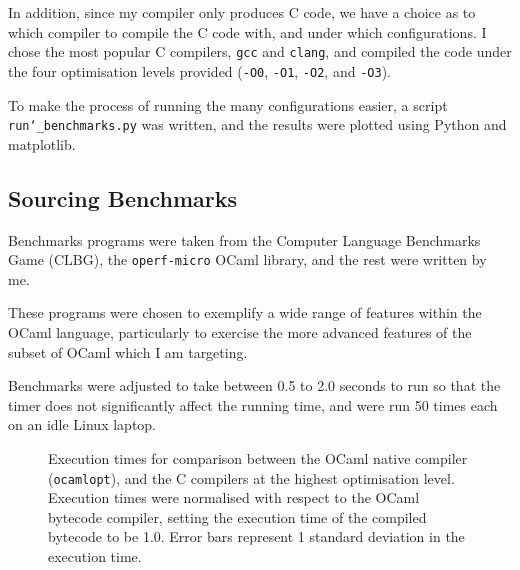 \documentclass[12pt,a4paper,twoside,openright]{report}
\begin{document}
In addition, since my compiler only produces C code, we have a choice as to 
which compiler to compile the C code with, and under which configurations. I 
chose the most popular C compilers, \texttt{gcc} and \texttt{clang}, and 
compiled the code under the four optimisation levels provided (\texttt{-O0}, 
\texttt{-O1}, \texttt{-O2}, and \texttt{-O3}).

To make the process of running the many configurations easier, a script 
\texttt{run\char`_benchmarks.py} was written, and the results were plotted 
using Python and matplotlib.

\subsection{Sourcing Benchmarks}

Benchmarks programs were taken from the Computer Language Benchmarks Game 
(CLBG)\cite{benchmarks-game}, the \texttt{operf-micro}\cite{operf-micro} OCaml 
library, and the rest were written by me.

These programs were chosen to exemplify a wide range of features within the 
OCaml language, particularly to exercise the more advanced features of the 
subset of OCaml which I am targeting.

Benchmarks were adjusted to take between 0.5 to 2.0 seconds to run so that the 
timer does not significantly affect the running time, and were run 50 times 
each on an idle Linux laptop.

\begin{figure}
    \label{fig:raw-benchmarks}
    \centering
    \caption{Execution times for comparison between the OCaml native compiler 
    (\texttt{ocamlopt}), and the C compilers at the highest optimisation level. 
    Execution times were normalised with respect to the OCaml bytecode 
    compiler, setting the execution time of the compiled bytecode to be 1.0. 
    Error bars represent 1 standard deviation in the execution time.}
\end{figure}
\end{document}
